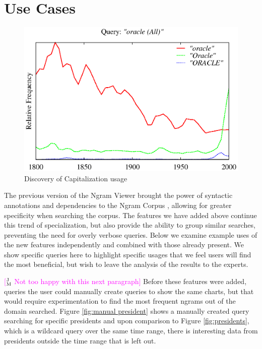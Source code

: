\documentclass[11pt,a4paper]{article}
\newcommand{\jmcomment}[1]{\textcolor{magenta}{[$^{\textsc{J}}_{\textsc{M}}$ #1]}}
\begin{document}


\section{Use Cases}
\label{sec:usecases}
\begin{figure}
\centering
\includegraphics[width=.9\textwidth]{graphs/oracle}
\caption{\label{fig:apple} Discovery of Capitalization usage}
\end{figure}
The previous version of the Ngram Viewer brought the power of syntactic annotations and dependencies to the Ngram Corpus \cite{lin2012syntactic}, allowing for greater specificity when searching the corpus. The features we have added above continue this trend of specialization, but also provide the ability to group similar searches, preventing the need for overly verbose queries. Below we examine example uses of the new features independently and combined with those already present. We show specific queries here to highlight specific usages that we feel users will find the most beneficial, but wish to leave the analysis of the results to the experts.


\jmcomment{Not too happy with this next paragraph}
Before these features were added, queries the user could manually create queries to show the same charts, but that would require experimentation to find the most frequent ngrams out of the domain searched. Figure \ref{fig:manual president} shows a manually created query searching for specific presidents and upon comparison to Figure \ref{fig:presidents}, which is a wildcard query over the same time range, there is interesting data from presidents outside the time range that is left out.
\end{document}
